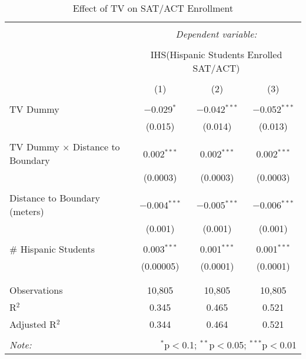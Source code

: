 
\begin{table}[!htbp] \centering 
  \caption{Effect of TV on SAT/ACT Enrollment} 
  \label{} 
\begin{tabular}{@{\extracolsep{-2pt}}lccc} 
\\[-1.8ex]\hline 
\hline \\[-1.8ex] 
 & \multicolumn{3}{c}{\textit{Dependent variable:}} \\ 
\cline{2-4} 
\\[-1.8ex] & \multicolumn{3}{c}{IHS(Hispanic Students Enrolled SAT/ACT)} \\ 
\\[-1.8ex] & (1) & (2) & (3)\\ 
\hline \\[-1.8ex] 
 TV Dummy & $-$0.029$^{*}$ & $-$0.042$^{***}$ & $-$0.052$^{***}$ \\ 
  & (0.015) & (0.014) & (0.013) \\ 
  & & & \\ 
 TV Dummy $\times$ Distance to Boundary & 0.002$^{***}$ & 0.002$^{***}$ & 0.002$^{***}$ \\ 
  & (0.0003) & (0.0003) & (0.0003) \\ 
  & & & \\ 
 Distance to Boundary (meters) & $-$0.004$^{***}$ & $-$0.005$^{***}$ & $-$0.006$^{***}$ \\ 
  & (0.001) & (0.001) & (0.001) \\ 
  & & & \\ 
 \# Hispanic Students & 0.003$^{***}$ & 0.001$^{***}$ & 0.001$^{***}$ \\ 
  & (0.00005) & (0.0001) & (0.0001) \\ 
  & & & \\ 
\hline \\[-1.8ex] 
Observations & 10,805 & 10,805 & 10,805 \\ 
R$^{2}$ & 0.345 & 0.465 & 0.521 \\ 
Adjusted R$^{2}$ & 0.344 & 0.464 & 0.521 \\ 
\hline 
\hline \\[-1.8ex] 
\textit{Note:}  & \multicolumn{3}{r}{$^{*}$p$<$0.1; $^{**}$p$<$0.05; $^{***}$p$<$0.01} \\ 
\end{tabular} 
\end{table} 
